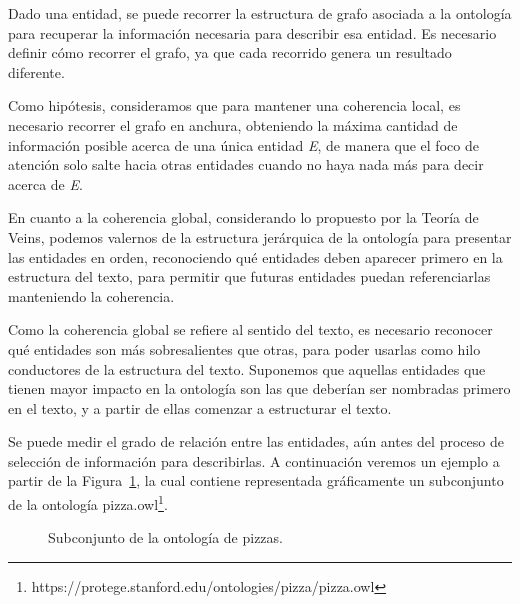 Dado una entidad, se puede recorrer la estructura de grafo asociada a la ontología para recuperar la información necesaria para describir esa entidad. Es necesario definir cómo recorrer el grafo, ya que cada recorrido genera un resultado diferente. 

Como hipótesis, consideramos que para mantener una coherencia local, es necesario recorrer el grafo en anchura, obteniendo la máxima cantidad de información posible acerca de una única entidad \emph{E}, de manera que el foco de atención solo salte hacia otras entidades cuando no haya nada más para decir acerca de \emph{E}.

En cuanto a la coherencia global, considerando lo propuesto por la Teoría de Veins, podemos valernos de la estructura jerárquica de la ontología para presentar las entidades en orden, reconociendo qué entidades deben aparecer primero en la estructura del texto, para permitir que futuras entidades puedan referenciarlas manteniendo la coherencia.

Como la coherencia global se refiere al sentido del texto, es necesario reconocer qué entidades son más sobresalientes que otras, para poder usarlas como hilo conductores de la estructura del texto. Suponemos que aquellas entidades que tienen mayor impacto en la ontología son las que deberían ser nombradas primero en el texto, y a partir de ellas comenzar a estructurar el texto.

Se puede medir el grado de relación entre las entidades, aún antes del proceso de selección de información para describirlas. A continuación veremos un ejemplo a partir de la Figura~\ref{fig:pizza.owl}, la cual contiene representada gráficamente un subconjunto de la ontología pizza.owl\footnote{https://protege.stanford.edu/ontologies/pizza/pizza.owl}.

\begin{figure}
\centering
{}
\caption{Subconjunto de la ontología de pizzas.} \label{fig:pizza.owl}
\end{figure}

